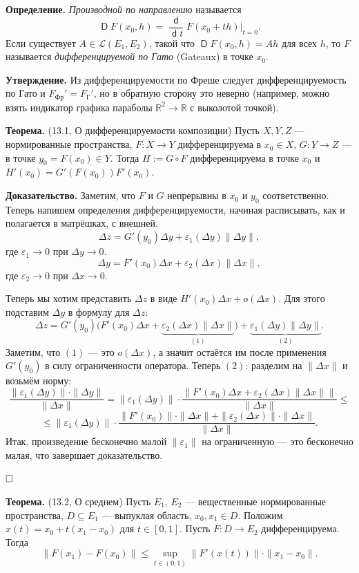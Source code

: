\documentclass[12pt, a4paper]{article}
\DeclareMathOperator{\dif}{\mathsf{d}}
\DeclareMathOperator{\Dif}{\mathsf{D}}
\newcommand{\QED}{$\hfill\square$}
\renewcommand{\le}{\leqslant}  %
\renewcommand{\subset}{\subseteq}   %
\begin{document}
\textbf{Определение.} \textit{Производной по направлению} называется 
\[
    \Dif F(x_0, h) = \frac{\dif}{\dif t} F(x_0 + th)\bigg|_{t = 0}.
\]
Если существует $A \in \mathcal L(E_1, E_2)$, такой что $\Dif F(x_0, h) = Ah$ для всех $h$, то $F$ называется \textit{дифференцируемой по Гато} (Gateaux) в точке $x_0$.

\textbf{Утверждение.} Из дифференцируемости по Фреше следует дифференцируемость по Гато и $F_{\text{Фр}}' = F_{\text{Г}}'$, но в обратную сторону это неверно (например, можно взять индикатор графика параболы $\mathbb{R}^2 \to \mathbb{R}$ с выколотой точкой).

\textbf{Теорема.} (13.1, О дифференцируемости композиции) Пусть $X, Y, Z$ --- нормированные пространства, $F: X \to Y$ дифференцируема в $x_0 \in X$, $G: Y \to Z$ --- в точке $y_0 = F(x_0) \in Y$.
Тогда $H := G \circ F$ дифференцируема в точке $x_0$ и $H'(x_0) = G'(F(x_0)) F'(x_0)$.

\textbf{Доказательство.} Заметим, что $F$ и $G$ непрерывны в $x_0$ и $y_0$ соответственно.
Теперь напишем определения дифференцируемости, начиная расписывать, как и полагается в матрёшках, с внешней.
\[
    \Delta z = G'(y_0) \Delta y + \varepsilon_1(\Delta y) \|\Delta y\|,
\]
где $\varepsilon_1 \to 0$ при $\Delta y \to 0$.
\[
    \Delta y = F'(x_0) \Delta x + \varepsilon_2(\Delta x) \|\Delta x\|,
\]
где $\varepsilon_2 \to 0$ при $\Delta x \to 0$.

Теперь мы хотим представить $\Delta z$ в виде $H'(x_0) \Delta x + o(\Delta x)$.
Для этого подставим $\Delta y$ в формулу для $\Delta z$:
\[
    \Delta z = G'(y_0) \big( F'(x_0) \Delta x + \underbrace{\varepsilon_2(\Delta x) \|\Delta x\|}_{(1)} \big) + \underbrace{\varepsilon_1(\Delta y) \|\Delta y\|}_{(2)}.
\]
Заметим, что $(1)$ --- это $o(\Delta x)$, а значит остаётся им после применения $G'(y_0)$ в силу ограниченности оператора.
Теперь $(2)$: разделим на $\|\Delta x\|$ и возьмём норму:
\[
    \frac{\|\varepsilon_1(\Delta y) \| \cdot \|\Delta y\|}{\|\Delta x\|} = \|\varepsilon_1(\Delta y) \| \cdot \frac{\bigg\|F'(x_0) \Delta x + \varepsilon_2(\Delta x) \|\Delta x\| \bigg\|}{\|\Delta x\|} \le
\]
\[
    \le \|\varepsilon_1(\Delta y) \| \cdot \frac{\|F'(x_0) \| \cdot \|\Delta x\| + \|\varepsilon_2(\Delta x) \| \cdot \|\Delta x\|}{\|\Delta x\|}.
\]
Итак, произведение бесконечно малой $\|\varepsilon_1\|$ на ограниченную --- это бесконечно малая, что завершает доказательство.

\QED

\textbf{Теорема.} (13.2, О среднем) Пусть $E_1$, $E_2$ --- вещественные нормированные пространства, $D \subset E_1$ --- выпуклая область, $x_0, x_1 \in D$.
Положим $x(t) = x_0 + t(x_1 - x_0)$ для $t \in [0, 1]$.
Пусть $F: D \to E_2$ дифференцируема.
Тогда
\[
    \|F(x_1) - F(x_0)\| \le \sup_{t \in (0, 1)} \|F'(x(t))\| \cdot \|x_1 - x_0\|.
\]
\end{document}
